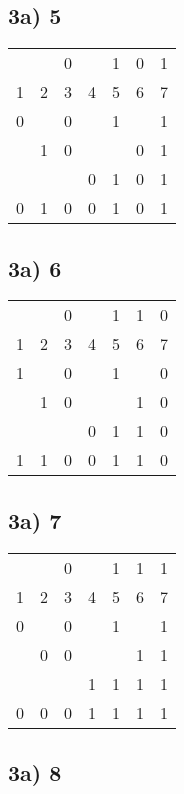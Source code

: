 \documentclass[]{article}
\begin{document}
\subsection{3a) 5}

\begin{longtable}[l]{@{}lllllll@{}}
	\toprule
	 & &0& &1&0&1\\
	1&2&3&4&5&6&7\\
	\endhead
	\midrule
	0& &0& &1& &1\\
	 &1&0& & &0&1\\
	 & & &0&1&0&1\\
	\hline
	0&1&0&0&1&0&1\\
	\bottomrule
\end{longtable}

\subsection{3a) 6}

\begin{longtable}[l]{@{}lllllll@{}}
	\toprule
	 & &0& &1&1&0\\
	1&2&3&4&5&6&7\\
	\endhead
	\midrule
	1& &0& &1& &0\\
	 &1&0& & &1&0\\
	 & & &0&1&1&0\\
	\hline
	1&1&0&0&1&1&0\\
	\bottomrule
\end{longtable}

\subsection{3a) 7}

\begin{longtable}[l]{@{}lllllll@{}}
	\toprule
	 & &0& &1&1&1\\
	1&2&3&4&5&6&7\\
	\endhead
	\midrule
	0& &0& &1& &1\\
	 &0&0& & &1&1\\
	 & & &1&1&1&1\\
	\hline
	0&0&0&1&1&1&1\\
	\bottomrule
\end{longtable}

\pagebreak

\subsection{3a) 8}
\end{document}
